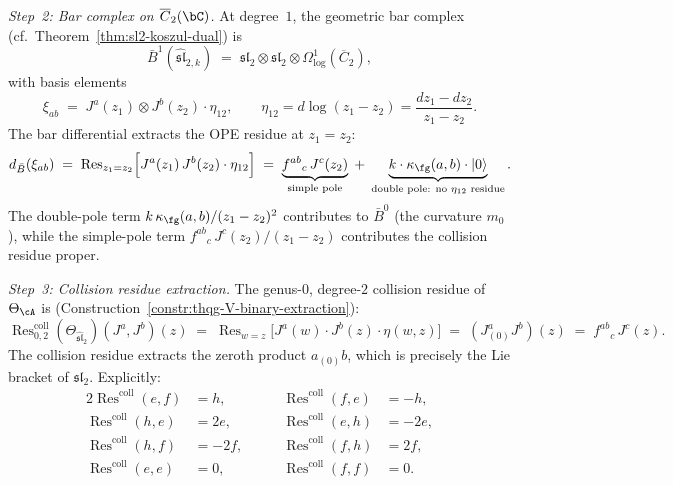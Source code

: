 \begin{computation}
\emph{Step~2: Bar complex on $\overline{C}_2(\bC)$.}
At degree~$1$, the geometric bar complex
(cf.\ Theorem~\ref{thm:sl2-koszul-dual}) is
\[
\bar{B}^1(\widehat{\mathfrak{sl}}_{2,k})
\;=\;
\mathfrak{sl}_2 \otimes \mathfrak{sl}_2 \otimes
\Omega^1_{\log}(\overline{C}_2),
\]
with basis elements
\[
\xi_{ab} \;=\; J^a(z_1) \otimes J^b(z_2)
\cdot \eta_{12},
\qquad
\eta_{12} = d\log(z_1 - z_2) = \frac{dz_1 - dz_2}{z_1 - z_2}.
\]
The bar differential extracts the OPE residue at $z_1 = z_2$:
\begin{equation}\label{eq:sl2-collision-bar-diff}
d_{\bar{B}}(\xi_{ab})
\;=\;
\operatorname{Res}_{z_1 = z_2}
\Bigl[
J^a(z_1)\, J^b(z_2)
\cdot \eta_{12}
\Bigr]
\;=\;
\underbrace{f^{ab}{}_{c}\, J^c(z_2)}_{\text{simple pole}}
\;+\;
\underbrace{k \cdot \kappa_{\fg}(a,b) \cdot |0\rangle}_{\text{double pole: no $\eta_{12}$ residue}}.
\end{equation}
The double-pole term $k\,\kappa_{\fg}(a,b)/(z_1 - z_2)^2$ contributes to
$\bar{B}^0$ (the curvature $m_0$), while the simple-pole term
$f^{ab}{}_c\, J^c(z_2)/(z_1 - z_2)$ contributes the
collision residue proper.

\emph{Step~3: Collision residue extraction.}
The genus-$0$, degree-$2$ collision residue of $\Theta_\cA$ is
(Construction~\ref{constr:thqg-V-binary-extraction}):
\begin{equation}\label{eq:sl2-collision-residue-formula}
\operatorname{Res}^{\mathrm{coll}}_{0,2}
(\Theta_{\widehat{\mathfrak{sl}}_2})(J^a, J^b)(z)
\;=\;
\operatorname{Res}_{w = z}
\bigl[J^a(w) \cdot J^b(z) \cdot \eta(w,z)\bigr]
\;=\;
(J^a_{(0)} J^b)(z)
\;=\;
f^{ab}{}_{c}\, J^c(z).
\end{equation}
The collision residue extracts the zeroth product $a_{(0)}b$,
which is precisely the Lie bracket of $\mathfrak{sl}_2$.
Explicitly:
\begin{alignat}{2}
\operatorname{Res}^{\mathrm{coll}}(e, f)
 &= h, &\qquad
\operatorname{Res}^{\mathrm{coll}}(f, e)
 &= -h,
 \label{eq:sl2-collision-explicit-ef} \\
\operatorname{Res}^{\mathrm{coll}}(h, e)
 &= 2e, &\qquad
\operatorname{Res}^{\mathrm{coll}}(e, h)
 &= -2e,
 \label{eq:sl2-collision-explicit-he} \\
\operatorname{Res}^{\mathrm{coll}}(h, f)
 &= -2f, &\qquad
\operatorname{Res}^{\mathrm{coll}}(f, h)
 &= 2f,
 \label{eq:sl2-collision-explicit-hf} \\
\operatorname{Res}^{\mathrm{coll}}(e, e)
 &= 0, &\qquad
\operatorname{Res}^{\mathrm{coll}}(f, f)
 &= 0.
 \label{eq:sl2-collision-explicit-diag}
\end{alignat}


\end{computation}
